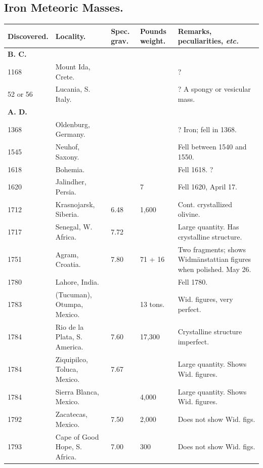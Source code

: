 \documentclass[a4paper, 12pt, oneside]{article}
\begin{document}
\subsection{Iron Meteoric Masses.}
\begin{center}
    \footnotesize
    \bfseries
    \begin{longtable}{|p{16mm}|p{34mm}|p{10mm}|p{12mm}|p{40mm}|}
    \hline
        Discovered. & Locality. & Spec. grav. & Pounds weight. & Remarks, peculiarities, \emph{etc.} \\ \hline
        \textbf{B. C.} & ~ & ~ & ~ & ~ \\
        1168 & Mount Ida, Crete. & ~ & ~ & ? \\
        52 or 56 & Lucania, S. Italy. & ~ & ~ & ? A spongy or vesicular mass. \\
        \textbf{A. D.} & ~ & ~ & ~ & ~ \\
        1368 & Oldenburg, Germany. & ~ & ~ & ? Iron; fell in 1368. \\
        1545 & Neuhof, Saxony. & ~ & ~ & Fell between 1540 and 1550. \\
        1618 & Bohemia. & ~ & ~ & Fell 1618. ? \\
        1620 & Jalindher, Persia. & ~ & 7 & Fell 1620, April 17. \\
        1712 & Krasnojarsk, Siberia. & 6.48 & 1,600 & Cont. crystallized olivine. \\
        1717 & Senegal, W. Africa. & 7.72 & ~ & Large quantity. Has crystalline structure. \\
        1751 & Agram, Croatia. & 7.80 & 71 + 16 & Two fragments; shows Widmänstattian figures when polished. May 26. \\
        1780 & Lahore, India. & ~ & ~ & Fell 1780. \\
        1783 & (Tucuman), Otumpa, Mexico. & ~ & 13 tons. & Wid. figures, very perfect. \\
        1784 & Rio de la Plata, S. America. & 7.60 & 17,300 & Crystalline structure imperfect. \\
        1784 & Ziquipilco, Toluca, Mexico. & 7.67 & ~ & Large quantity. Shows Wid. figures. \\
        1784 & Sierra Blanca, Mexico. & ~ & 4,000 & Large quantity. Shows Wid. figures. \\
        1792 & Zacatecas, Mexico. & 7.50 & 2,000 & Does not show Wid. figs. \\
        1793 & Cape of Good Hope, S. Africa. & 7.00 & 300 & Does not show Wid. figs. \\

\end{longtable}
\end{center}
\end{document}
